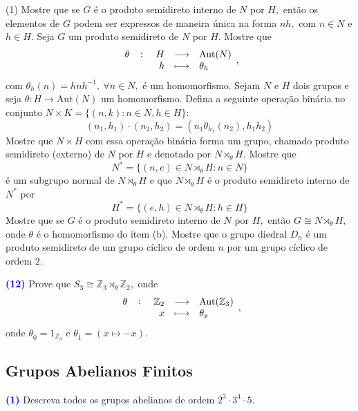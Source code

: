 \documentclass[12pt, a4paper]{article}
\newcommand{\negrito}[1]{\mbox{\boldmath{$#1$}}}
\begin{document}
\begin{tasks}[counter-format={(tsk[a])},label-width=3.6ex, label-format = {\bfseries}, column-sep = {0pt}](1)
\task[\textcolor{Floresta}{$\negrito{(a)} $}] Mostre que se $G$ é o produto semidireto interno de $N$ por $H,$ então os elementos de $G$ podem ser expressos de maneira única na forma $nh,$ com $n \in N$ e $h \in H.$
\task[\textcolor{Floresta}{$\negrito{(b)} $}] Seja $G$ um produto semidireto de $N$ por $H.$ Mostre que
\[
\fullfunction{\theta}{H}{\mbox{Aut}(N)}{h}{\theta_h},
\]
com $\theta_h(n) = hnh^{-1}, \ \forall n \in N,$ é um homomorfismo.
\task[\textcolor{Floresta}{$\negrito{(c)} $}] Sejam $N$ e $H$ dois grupos e seja $\theta \colon H \to \mbox{Aut}(N)$ um homomorfismo. Defina a seguinte operação binária no conjunto $N \times K = \{ (n,k) : n \in N, h \in H \}:$
\[
(n_1, h_1) \cdot (n_2,h_2) = (n_1 \theta_{h_1}(n_2), h_1h_2)
\]
Mostre que $N \times H$ com essa operação binária forma um grupo, chamado produto semidireto (externo) de $N$ por $H$ e denotado por $N \rtimes_{\theta} H.$
\task[\textcolor{Floresta}{$\negrito{(d)} $}] Mostre que
\[
N^{*} = \{ (n,e) \in N \rtimes_{\theta} H : n \in N \}
\]
é um subgrupo normal de $N \rtimes_{\theta} H$ e que $N \rtimes_{\theta} H$ é o produto semidireto interno de $N^{*}$ por  \[
H^{*} = \{ (e,h) \in N \rtimes_{\theta} H : h \in H \}
\]
\task[\textcolor{Floresta}{$\negrito{(e)} $}] Mostre que se $G$ é o produto semidireto interno de $N$ por $H,$ então $G \cong N \rtimes_{\theta} H,$ onde $\theta$ é o homomorfismo do item (b).
\task[\textcolor{Floresta}{$\negrito{(f)} $}] Mostre que o grupo diedral $D_n$ é um produto semidireto de um grupo cíclico de ordem $n$ por um grupo cíclico de ordem $2.$
\end{tasks}
\textcolor{blue}{\bf(12)}\label{92} Prove que $S_3 \cong \mathbb{Z}_3 \rtimes_{\theta} \mathbb{Z}_2,$ onde 
\[
\fullfunction{\theta}{\mathbb{Z}_2}{\mbox{Aut}(\mathbb{Z}_3)}{x}{\theta_x},
\]
onde $\theta_{\overline{0}} = 1_{\mathbb{Z}_3}$ e $\theta_{\overline{1}} = (x \mapsto -x).$
\newpage
\subsection{\textcolor{Floresta}{Grupos Abelianos Finitos}}

\textcolor{blue}{\bf(1)}\label{93} Descreva todos os grupos abelianos de ordem $2^3 \cdot 3^4 \cdot 5.$
\newline\newline
\end{document}
